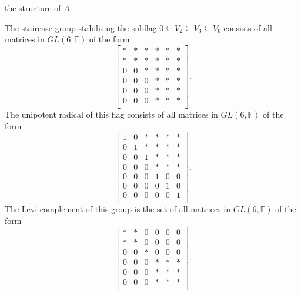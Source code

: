 the structure of $A.$
\begin{example}
	The staircase group stabilising the subflag $0 \subseteq V_2 \subseteq
	V_3 \subseteq V_6$ consists of all matrices in $GL(6, \mathbb{F})$ of the
	form
	$$ \begin{bmatrix}
		  \ast  &  \ast  &  \ast  &  \ast  &  \ast  &  \ast  \\
		  \ast  &  \ast  &  \ast  &  \ast  &  \ast  &  \ast  \\
		    0   &   0    &  \ast  &  \ast  &  \ast  &  \ast  \\
		    0   &   0    &    0   &  \ast  &  \ast  &  \ast  \\
		    0   &   0    &    0   &  \ast  &  \ast  &  \ast  \\
		    0   &   0    &    0   &  \ast  &  \ast  &  \ast  \\
\end{bmatrix} .$$
The unipotent radical of this flag consists of all matrices in $GL(6, \mathbb{F})$
of the form
$$\begin{bmatrix}
	   1   &   0   & \ast  & \ast  & \ast  & \ast  \\
	   0   &   1   & \ast  & \ast  & \ast  & \ast  \\
	   0   &   0   &   1   & \ast  & \ast  & \ast  \\
	   0   &   0   &   0   & \ast  & \ast  & \ast  \\
	   0   &   0   &   0   &   1   &   0   &   0   \\
	   0   &   0   &   0   &   0   &   1   &   0   \\
	   0   &   0   &   0   &   0   &   0   &   1   \\
   \end{bmatrix}.$$
The Levi complement of this group is the set of all matrices in $GL(6, \mathbb{F})$
of the form
	$$ \begin{bmatrix}
		  \ast  &  \ast  &    0   &   0    &    0   &   0    \\
		  \ast  &  \ast  &    0   &   0    &    0   &   0    \\
		    0   &   0    &  \ast  &   0    &    0   &   0    \\
		    0   &   0    &    0   &  \ast  &  \ast  &  \ast  \\
		    0   &   0    &    0   &  \ast  &  \ast  &  \ast  \\
		    0   &   0    &    0   &  \ast  &  \ast  &  \ast  \\
\end{bmatrix} .$$
\end{example}


